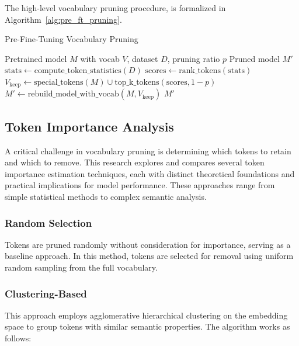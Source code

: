 \documentclass[twocolumn]{article}
\begin{document}
The high-level vocabulary pruning procedure, is formalized in Algorithm~\ref{alg:pre_ft_pruning}.

\begin{algorithm}[H]
\small
\caption{Pre-Fine-Tuning Vocabulary Pruning}
\label{alg:pre_ft_pruning}
\begin{algorithmic}[1]
\Require Pretrained model $M$ with vocab $V$, dataset $D$, pruning ratio $p$
\Ensure Pruned model $M'$
\State $\text{stats} \gets \text{compute\_token\_statistics}(D)$
\State $\text{scores} \gets \text{rank\_tokens}(\text{stats})$
\State $V_{\text{keep}} \gets \text{special\_tokens}(M)\cup\text{top\_k\_tokens}(\text{scores}, 1 - p)$
\State $M' \gets \text{rebuild\_model\_with\_vocab}(M, V_{\text{keep}})$
\State \Return $M'$
\end{algorithmic}
\end{algorithm}

\subsection{Token Importance Analysis}
A critical challenge in vocabulary pruning is determining which tokens to retain and which to remove. This research explores and compares several token importance estimation techniques, each with distinct theoretical foundations and practical implications for model performance. These approaches range from simple statistical methods to complex semantic analysis.

\subsubsection{Random Selection}
Tokens are pruned randomly without consideration for importance, serving as a baseline approach. In this method, tokens are selected for removal using uniform random sampling from the full vocabulary.

\subsubsection{Clustering-Based}
This approach employs agglomerative hierarchical clustering on the embedding space to group tokens with similar semantic properties. The algorithm works as follows:
\end{document}
